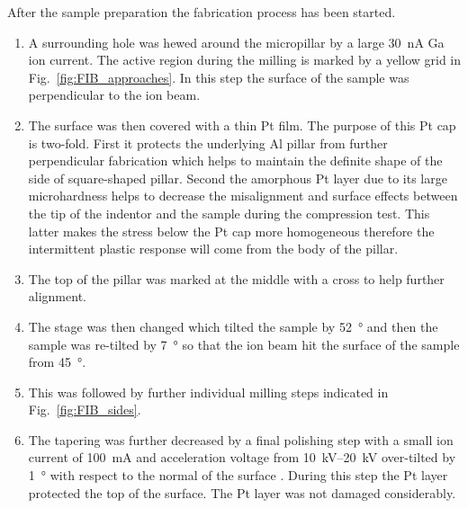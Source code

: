 After the sample preparation the fabrication process has been started. 
\begin{enumerate}
\item A surrounding hole was hewed around the micropillar by a large \SI{30}{\nano\ampere} Ga ion current. The active region during the milling is marked by a yellow grid in Fig.~\ref{fig:FIB_approaches}. In this step the surface of the sample was perpendicular to the ion beam. 
\item The surface was then covered with a thin Pt film. The purpose of this Pt cap is two-fold. First it protects the underlying Al pillar from further perpendicular fabrication which helps to maintain the definite shape of the side of square-shaped pillar. Second the amorphous Pt layer due to its large microhardness helps to decrease the misalignment and surface effects between the tip of the indentor and the sample during the compression test. This latter makes the stress below the Pt cap more homogeneous therefore the intermittent plastic response will come from the body of the pillar. 
\item The top of the pillar was marked at the middle with a cross to help further alignment.
\item The stage was then changed which tilted the sample by \SI{52}{\degree} and then the sample was re-tilted by \SI{7}{\degree} so that the ion beam hit the surface of the sample from \SI{45}{\degree}.
\item This was followed by further individual milling steps indicated in Fig.~\ref{fig:FIB_sides}. 
\item The tapering was further decreased by a final polishing step with a small ion current of \SI{100}{mA} and acceleration voltage from \SIrange{10}{20}{kV} over-tilted by \SI{1}{\degree} with respect to the normal of the surface \cite{LI200664}. During this step the Pt layer protected the top of the surface. The Pt layer was not damaged considerably.
\end{enumerate}

